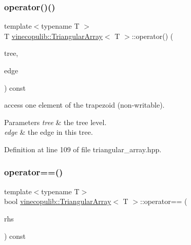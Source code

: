 \mbox{\label{classvinecopulib_1_1_triangular_array_a9909caab2252198416abcb3294181dee}} 
\subsubsection{\texorpdfstring{operator()()}{operator()()}\hspace{0.1cm}{\footnotesize\ttfamily [2/2]}}
{\footnotesize\ttfamily template$<$typename T $>$ \\
T \hyperlink{classvinecopulib_1_1_triangular_array}{vinecopulib\+::\+Triangular\+Array}$<$ T $>$\+::operator() (\begin{DoxyParamCaption}\item[{size\+\_\+t}]{tree,  }\item[{size\+\_\+t}]{edge }\end{DoxyParamCaption}) const}



access one element of the trapezoid (non-\/writable). 


\begin{DoxyParams}{Parameters}
{\em tree} & the tree level. \\
\hline
{\em edge} & the edge in this tree. \\
\hline
\end{DoxyParams}


Definition at line 109 of file triangular\+\_\+array.\+hpp.

\mbox{\label{classvinecopulib_1_1_triangular_array_a2bb6d8ef421bbcef635970000b072727}} 
\subsubsection{\texorpdfstring{operator==()}{operator==()}}
{\footnotesize\ttfamily template$<$typename T$>$ \\
bool \hyperlink{classvinecopulib_1_1_triangular_array}{vinecopulib\+::\+Triangular\+Array}$<$ T $>$\+::operator== (\begin{DoxyParamCaption}\item[{const \hyperlink{classvinecopulib_1_1_triangular_array}{Triangular\+Array}$<$ T $>$ \&}]{rhs }\end{DoxyParamCaption}) const}



